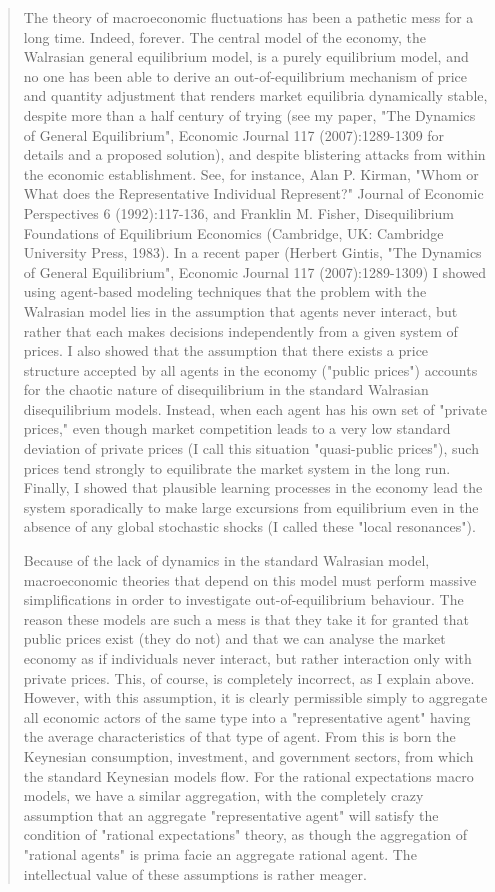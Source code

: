 \begin{quote}
The theory of macroeconomic fluctuations has been a pathetic mess for a long time. Indeed, forever. The central model of the economy, the Walrasian general equilibrium model, is a purely equilibrium model, and no one has been able to derive an out-of-equilibrium mechanism of price and quantity adjustment that renders market equilibria dynamically stable, despite more than a half century of trying (see my paper, "The Dynamics of General Equilibrium", Economic Journal 117 (2007):1289-1309 for details and a proposed solution), and despite blistering attacks from within the economic establishment. See, for instance, Alan P. Kirman, "Whom or What does the Representative Individual Represent?" Journal of Economic Perspectives 6 (1992):117-136, and Franklin M. Fisher, Disequilibrium Foundations of Equilibrium Economics (Cambridge, UK: Cambridge University Press, 1983). In a recent paper (Herbert Gintis, "The Dynamics of General Equilibrium", Economic Journal 117 (2007):1289-1309) I showed using agent-based modeling techniques that the problem with the Walrasian model lies in the assumption that agents never interact, but rather that each makes decisions independently from a given system of prices. I also showed that the assumption that there exists a price structure accepted by all agents in the economy ("public prices") accounts for the chaotic nature of disequilibrium in the standard Walrasian disequilibrium models. Instead, when each agent has his own set of "private prices," even though market competition leads to a very low standard deviation of private prices (I call this situation "quasi-public prices"), such prices tend strongly to equilibrate the market system in the long run. Finally, I showed that plausible learning processes in the economy lead the system sporadically to make large excursions from equilibrium even in the absence of any global stochastic shocks (I called these "local resonances").

Because of the lack of dynamics in the standard Walrasian model, macroeconomic theories that depend on this model must perform massive simplifications in order to investigate out-of-equilibrium behaviour. The reason these models are such a mess is that they take it for granted that public prices exist (they do not) and that we can analyse the market economy as if individuals never interact, but rather interaction only with private prices. This, of course, is completely incorrect, as I explain above. However, with this assumption, it is clearly permissible simply to aggregate all economic actors of the same type into a "representative agent" having the average characteristics of that type of agent. From this is born the Keynesian consumption, investment, and government sectors, from which the standard Keynesian models flow. For the rational expectations macro models, we have a similar aggregation, with the completely crazy assumption that an aggregate "representative agent" will satisfy the condition of "rational expectations" theory, as though the aggregation of "rational agents" is prima facie an aggregate rational agent. The intellectual value of these assumptions is rather meager.


\end{quote}
